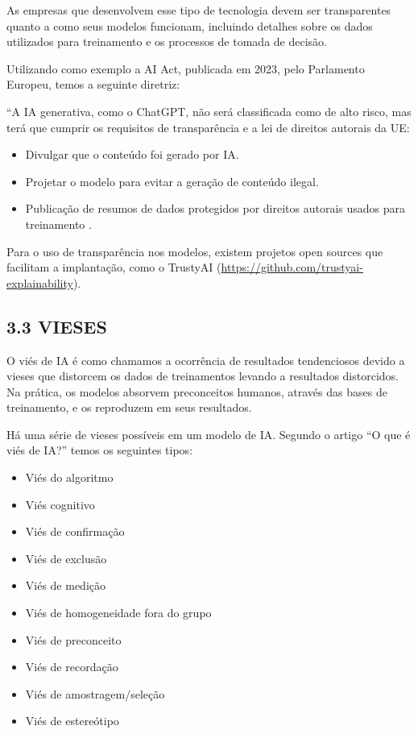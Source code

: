 As empresas que desenvolvem esse tipo de tecnologia devem ser transparentes quanto a como seus modelos funcionam, incluindo detalhes sobre os dados utilizados para treinamento e os processos de tomada de decisão.

Utilizando como exemplo a AI Act, publicada em 2023, pelo Parlamento Europeu, temos a seguinte diretriz:

“A IA generativa, como o ChatGPT, não será classificada como de alto risco, mas terá que cumprir os requisitos de transparência e a lei de direitos autorais da UE:

\begin{itemize}
    \item Divulgar que o conteúdo foi gerado por IA.
    \item Projetar o modelo para evitar a geração de conteúdo ilegal.
    \item Publicação de resumos de dados protegidos por direitos autorais usados para treinamento \cite{ep2023}.
\end{itemize}

Para o uso de transparência nos modelos, existem projetos open sources que facilitam a implantação, como o TrustyAI (\url{https://github.com/trustyai-explainability}).

\subsection*{{3.3 VIESES}}
O viés de IA é como chamamos a ocorrência de resultados tendenciosos devido a vieses que distorcem os dados de treinamentos levando a resultados distorcidos. Na prática, os modelos absorvem preconceitos humanos, através das bases de treinamento, e os reproduzem em seus resultados.

Há uma série de vieses possíveis em um modelo de IA. Segundo o artigo “O que é viés de IA?” \cite{ibm2023} temos os seguintes tipos:

\begin{itemize}
\item Viés do algoritmo
\item Viés cognitivo
\item Viés de confirmação
\item Viés de exclusão
\item Viés de medição
\item Viés de homogeneidade fora do grupo
\item Viés de preconceito
\item Viés de recordação
\item Viés de amostragem/seleção
\item Viés de estereótipo 
\end{itemize}

